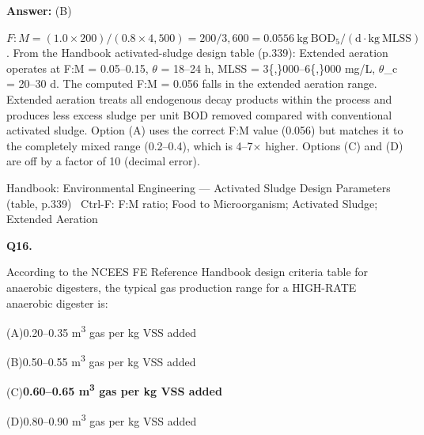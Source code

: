 \documentclass[11pt]{article}
\newcommand{\correct}[1]{\textbf{#1}\;{\color{accent}$\checkmark$}}
\newcommand{\optline}[2]{\par\noindent\hspace{1.2em}(#1)\hspace{0.6em}#2}
\begin{document}
\par\vspace{3pt}
\vspace{2pt}\par\noindent\colorbox{boxbg}{\parbox{\dimexpr\linewidth-2\fboxsep\relax}{%
\vspace{2pt}\textbf{Answer:} (B)\par\vspace{2pt}
{\small $F:M = (1.0\times200)/(0.8\times4{,}500) = 200/3{,}600 = 0.0556\ \mathrm{kg\ BOD_5/(d\cdot kg\ MLSS)}$. From the Handbook activated-sludge design table (p.339): Extended aeration operates at F:M = 0.05--0.15, $\theta$ = 18--24 h, MLSS = 3\{,\}000--6\{,\}000 mg/L, $\theta$\_c = 20--30 d. The computed F:M = 0.056 falls in the extended aeration range. Extended aeration treats all endogenous decay products within the process and produces less excess sludge per unit BOD removed compared with conventional activated sludge. Option (A) uses the correct F:M value (0.056) but matches it to the completely mixed range (0.2--0.4), which is 4--7$\times$ higher. Options (C) and (D) are off by a factor of 10 (decimal error).}\par\vspace{2pt}
{\footnotesize\color{soft}Handbook: Environmental Engineering --- Activated Sludge Design Parameters (table, p.339) \textbullet\ Ctrl-F: F:M ratio; Food to Microorganism; Activated Sludge; Extended Aeration}\vspace{2pt}
}}
\vspace{9pt}
\filbreak
\textbf{\color{accent}Q16.}\par\vspace{2pt}
According to the NCEES FE Reference Handbook design criteria table for anaerobic digesters, the typical gas production range for a HIGH-RATE anaerobic digester is:\par\vspace{3pt}
\optline{A}{0.20--0.35 m\textsuperscript{3} gas per kg VSS added}
\optline{B}{0.50--0.55 m\textsuperscript{3} gas per kg VSS added}
\optline{C}{\correct{0.60--0.65 m\textsuperscript{3} gas per kg VSS added}}
\optline{D}{0.80--0.90 m\textsuperscript{3} gas per kg VSS added}
\par\vspace{3pt}
\end{document}
